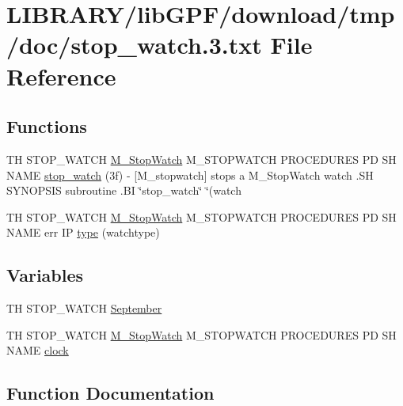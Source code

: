 \hypertarget{stop__watch_83_8txt}{}\section{L\+I\+B\+R\+A\+R\+Y/lib\+G\+P\+F/download/tmp/doc/stop\+\_\+watch.3.txt File Reference}
\label{stop__watch_83_8txt}
\subsection*{Functions}
\begin{DoxyCompactItemize}
\item 
TH S\+T\+O\+P\+\_\+\+W\+A\+T\+CH \hyperlink{option__stopwatch_83_8txt_aa2011fc45a5e502e87ee50996a8a9305}{M\+\_\+\+Stop\+Watch} M\+\_\+\+S\+T\+O\+P\+W\+A\+T\+CH P\+R\+O\+C\+E\+D\+U\+R\+ES PD SH N\+A\+ME \hyperlink{stop__watch_83_8txt_a6c6e2d89b31d43f474ee6a56e1330368}{stop\+\_\+watch} (3f) -\/ \mbox{[}\+M\+\_\+stopwatch\mbox{]} stops a M\+\_\+\+Stop\+Watch watch .\+S\+H S\+Y\+N\+O\+P\+S\+I\+S subroutine .\+B\+I \char`\"{}stop\+\_\+watch\char`\"{} \char`\"{}(watch
\item 
TH S\+T\+O\+P\+\_\+\+W\+A\+T\+CH \hyperlink{option__stopwatch_83_8txt_aa2011fc45a5e502e87ee50996a8a9305}{M\+\_\+\+Stop\+Watch} M\+\_\+\+S\+T\+O\+P\+W\+A\+T\+CH P\+R\+O\+C\+E\+D\+U\+R\+ES PD SH N\+A\+ME err IP \hyperlink{stop__watch_83_8txt_a70f0ead91c32e25323c03265aa302c1c}{type} (watchtype)
\end{DoxyCompactItemize}
\subsection*{Variables}
\begin{DoxyCompactItemize}
\item 
TH S\+T\+O\+P\+\_\+\+W\+A\+T\+CH \hyperlink{stop__watch_83_8txt_a1d05d9f5f870208fd0790859b520508a}{September}
\item 
TH S\+T\+O\+P\+\_\+\+W\+A\+T\+CH \hyperlink{option__stopwatch_83_8txt_aa2011fc45a5e502e87ee50996a8a9305}{M\+\_\+\+Stop\+Watch} M\+\_\+\+S\+T\+O\+P\+W\+A\+T\+CH P\+R\+O\+C\+E\+D\+U\+R\+ES PD SH N\+A\+ME \hyperlink{stop__watch_83_8txt_a148c035b430d6edf5413dbd2704facfb}{clock}
\end{DoxyCompactItemize}


\subsection{Function Documentation}
\mbox{\label{stop__watch_83_8txt_a6c6e2d89b31d43f474ee6a56e1330368}} 
